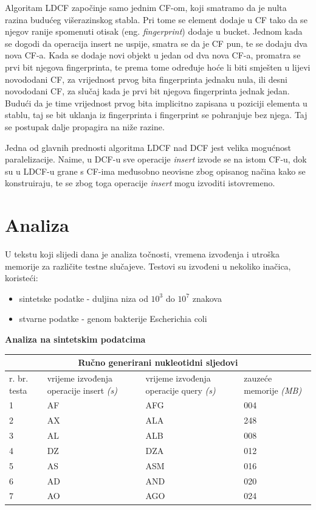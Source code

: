 \documentclass[times, utf8, seminar, numeric]{fer}
\begin{document}
Algoritam LDCF započinje samo jednim CF-om, koji smatramo da je nulta razina budućeg višerazinskog stabla. Pri tome se element dodaje u CF tako da se njegov ranije spomenuti otisak (eng. \textit{fingerprint}) dodaje u bucket. Jednom kada se dogodi da operacija insert ne uspije, smatra se da je CF pun, te se dodaju dva nova CF-a. Kada se dodaje novi objekt u jedan od dva nova CF-a, promatra se prvi bit njegova fingerprinta, te prema tome određuje hoće li biti smješten u lijevi novododani CF, za vrijednost prvog bita fingerprinta jednaku nula, ili desni novododani CF, za slučaj kada je prvi bit njegova fingerprinta jednak jedan. Budući da je time vrijednost prvog bita implicitno zapisana u poziciji elementa u stablu, taj se bit uklanja iz fingerprinta i fingerprint se pohranjuje bez njega. Taj se postupak dalje propagira na niže razine.

Jedna od glavnih prednosti algoritma LDCF nad DCF jest velika mogućnost paralelizacije. Naime, u DCF-u sve operacije \textit{insert} izvode se na istom CF-u, dok su u LDCF-u grane s CF-ima međusobno neovisne zbog opisanog načina kako se konstruiraju, te se zbog toga operacije \textit{insert} mogu izvoditi istovremeno.
 
\chapter{Analiza}
\label{Analiza}

U tekstu koji slijedi dana je analiza točnosti, vremena izvođenja i utroška memorije za različite testne slučajeve. Testovi su izvođeni u nekoliko inačica, koristeći:
\begin{itemize}

  \item {sintetske podatke - duljina niza od $10^3$ do $10^7$ znakova}
  \item {stvarne podatke - genom bakterije Escherichia coli}

\end{itemize}


\begin{flushleft}
\textbf{Analiza na sintetskim podatcima}
\end{flushleft}

\begin{tabular}
{ |p{0.8cm}||p{4cm}|p{4cm}|p{4cm}|  }
 \hline
 \multicolumn{4}{|c|}{Ručno generirani nukleotidni sljedovi} \\
 \hline
 r. br. testa& vrijeme izvođenja operacije insert \textit{(s)} & vrijeme izvođenja operacije query \textit{(s)} &zauzeće memorije \textit{(MB)}\\
 \hline
 1& AF    &AFG&   004\\
 2&   AX  & ALA   &248\\
 3&AL & ALB&  008\\
 4&DZ & DZA&  012\\
 5&   AS  & ASM&016\\
 6& AD  & AND   &020\\
 7& AO  & AGO&024\\
 \hline
\end{tabular}
\end{document}
